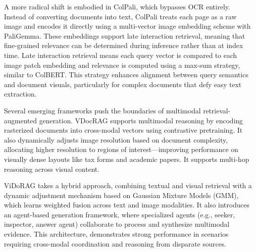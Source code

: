 \documentclass[12pt,twoside]{report}
\begin{document}
A more radical shift is embodied in ColPali\cite{ColPali}, which bypasses OCR entirely. Instead of converting documents into text, ColPali treats each page as a raw image and encodes it directly using a multi-vector image embedding scheme with PaliGemma. These embeddings support late interaction retrieval, meaning that fine-grained relevance can be determined during inference rather than at index time. Late interaction retrieval means each query vector is compared to each image patch embedding and relevance is computed using a max-sum strategy, similar to ColBERT. This strategy enhances alignment between query semantics and document visuals, particularly for complex documents that defy easy text extraction.

Several emerging frameworks push the boundaries of multimodal retrieval-augmented generation. VDocRAG\cite{VDocRAG} supports multimodal reasoning by encoding rasterized documents into cross-modal vectors using contrastive pretraining. It also dynamically adjusts image resolution based on document complexity, allocating higher resolution to regions of interest—improving performance on visually dense layouts like tax forms and academic papers. It supports multi-hop reasoning across visual content.

ViDoRAG\cite{ViDoRAG} takes a hybrid approach, combining textual and visual retrieval with a dynamic adjustment mechanism based on Gaussian Mixture Models (GMM), which learns weighted fusion across text and image modalities. It also introduces an agent-based generation framework, where specialized agents (e.g., seeker, inspector, answer agent) collaborate to process and synthesize multimodal evidence. This architecture, demonstrates strong performance in scenarios requiring cross-modal coordination and reasoning from disparate sources.
\end{document}
